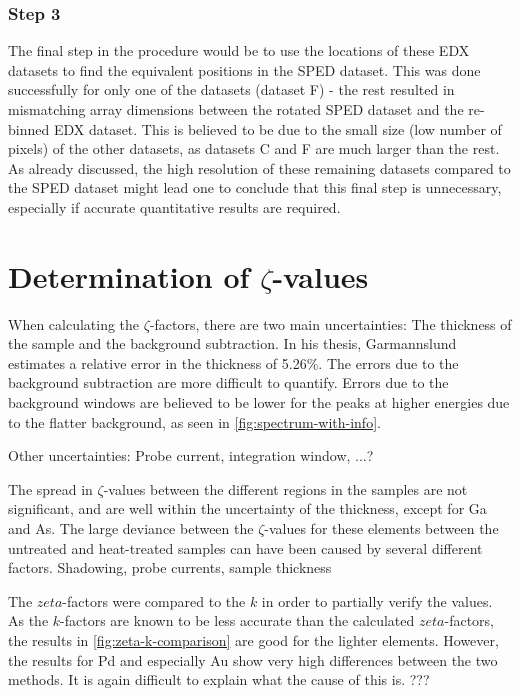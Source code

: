 \subsubsection{Step 3}

The final step in the procedure would be to use the locations of these EDX datasets to find the equivalent positions in the SPED dataset. This was done successfully for only one of the datasets (dataset F) - the rest resulted in mismatching array dimensions between the rotated SPED dataset and the re-binned EDX dataset. This is believed to be due to the small size (low number of pixels) of the other datasets, as datasets C and F are much larger than the rest. As already discussed, the high resolution of these remaining datasets compared to the SPED dataset might lead one to conclude that this final step is unnecessary, especially if accurate quantitative results are required.

\section{Determination of $\zeta$-values}

When calculating the $\zeta$-factors, there are two main uncertainties: The thickness of the sample and the background subtraction. In his thesis, Garmannslund estimates a relative error in the thickness of 5.26\%. The errors due to the background subtraction are more difficult to quantify. Errors due to the background windows are believed to be lower for the peaks at higher energies due to the flatter background, as seen in \cref{fig:spectrum-with-info}. %

Other uncertainties: Probe current, integration window, ...?

The spread in $\zeta$-values between the different regions in the samples are not significant, and are well within the uncertainty of the thickness, except for Ga and As. The large deviance between the $\zeta$-values for these elements between the untreated and heat-treated samples can have been caused by several different factors. Shadowing, probe currents, sample thickness%

The $zeta$-factors were compared to the $k$ in order to partially verify the values. As the $k$-factors are known to be less accurate than the calculated $zeta$-factors, the results in \cref{fig:zeta-k-comparison} are good for the lighter elements. However, the results for Pd and especially Au show very high differences between the two methods. It is again difficult to explain what the cause of this is. ???

